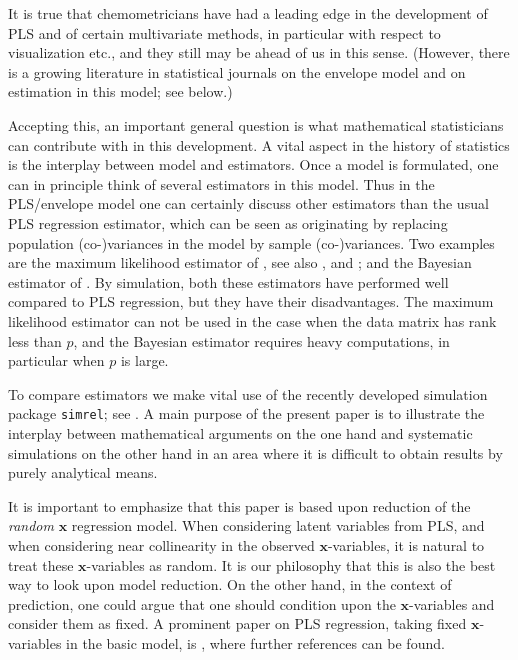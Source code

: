 \documentclass[a4paper, 11pt]{article}
\begin{document}
It is true that chemometricians have had a leading edge in the development of PLS and of certain multivariate methods, in particular with respect to visualization etc., and they still may be ahead of us in this sense. (However, there is a growing literature in statistical journals on the envelope model and on estimation in this model; see below.)

Accepting this, an important general question is what mathematical statisticians can contribute with in this development. A vital aspect in the history of statistics is the interplay between model and estimators. Once a model is formulated, one can in principle think of several estimators in this model. Thus in the PLS/envelope model one can certainly discuss other estimators than the usual PLS regression estimator, which can be seen as originating by replacing population (co-)variances in the model by sample (co-)variances. Two examples are the maximum likelihood estimator of \citet{cook2013envelopes}, see also \citet{cook2015envlp}, \citet{cook2016note} and \citet{cook2016algorithms}; and the Bayesian estimator of \citet{helland2012near}. By simulation, both these estimators have performed well compared to PLS regression, but they have their disadvantages. The maximum likelihood estimator can not be used in the case when the data matrix has rank less than $p$, and the Bayesian estimator requires heavy computations, in particular when $p$ is large.

To compare estimators we make vital use of the recently developed simulation package {\tt simrel}; see \citet{saebo2015simrel}. A main purpose of the present paper is to illustrate the interplay between mathematical arguments on the one hand and systematic simulations on the other hand in an area where it is difficult to obtain results by purely analytical means.

It is important to emphasize that this paper is based upon reduction of the \emph{random} $\bm{x}$ regression model. When considering latent variables from PLS, and when considering near collinearity in the observed $\bm{x}$-variables, it is natural to treat these $\bm{x}$-variables as random. It is our philosophy that this is also the best way to look upon model reduction. On the other hand, in the context of prediction, one could argue that one should condition upon the $\bm{x}$-variables and consider them as fixed. A prominent paper on PLS regression, taking fixed $\bm{x}$-variables in the basic model, is \citet{kramer2012degrees}, where further references can be found.
\end{document}
